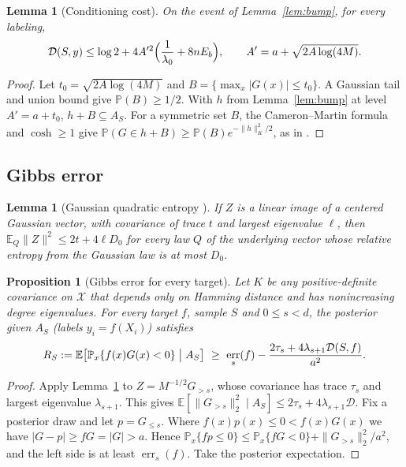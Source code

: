 \documentclass[11pt]{article}
\newtheorem{lemma}[theorem]{Lemma}
\newtheorem{proposition}[theorem]{Proposition}
\theoremstyle{definition}\newtheorem{assumption}[theorem]{Assumption}
\theoremstyle{remark}\newtheorem{remark}[theorem]{Remark}
\DeclareMathOperator{\err}{err}
\newcommand{\E}{\mathbb E}
\newcommand{\Pp}{\mathbb P}
\newcommand{\X}{\mathcal X}
\begin{document}
\begin{lemma}[Conditioning cost]\label{lem:cost}
On the event of Lemma~\ref{lem:bump}, for every labeling,
\[
 \mathcal D(S,y)\le\log2+4A'^2\Bigl(\frac1{\lambda_0}+8nE_b\Bigr),
 \qquad A'=a+\sqrt{2A\log(4M)} .
\]
\end{lemma}
\begin{proof}
Let $t_0=\sqrt{2A\log(4M)}$ and $B=\{\max_x|G(x)|\le t_0\}$. A Gaussian
tail and union bound give $\Pp(B)\ge1/2$. With $h$ from
Lemma~\ref{lem:bump} at level $A'=a+t_0$, $h+B\subseteq A_S$. For a
symmetric set $B$, the Cameron--Martin formula and $\cosh\ge1$ give
$\Pp(G\in h+B)\ge\Pp(B)e^{-\|h\|_K^2/2}$, as in
\cite[proof of Lemma~7.1]{subcritical}.
\end{proof}

\subsection{Gibbs error}
\begin{lemma}[Gaussian quadratic entropy {\cite[Lemma~9.1]{subcritical}}]
\label{lem:entropy}
If $Z$ is a linear image of a centered Gaussian vector, with covariance of
trace $t$ and largest eigenvalue $\ell$, then $\E_Q\|Z\|^2\le2t+4\ell D_0$
for every law $Q$ of the underlying vector whose relative entropy from
the Gaussian law is at most $D_0$.
\end{lemma}

\begin{proposition}[Gibbs error for every target]\label{prop:gibbs}
Let $K$ be any positive-definite covariance on $\X$ that depends only on
Hamming distance and has nonincreasing degree eigenvalues. For every
target $f$, sample $S$ and $0\le s<d$, the posterior given
$A_S$ (labels $y_i=f(X_i)$) satisfies
\[
 R_S:=\E\bigl[\Pp_x\{f(x)G(x)<0\}\bigm|A_S\bigr]
 \ \ge\ \err_s(f)-\frac{2\tau_s+4\lambda_{s+1}\mathcal D(S,f)}{a^2}.
\]
\end{proposition}
\begin{proof}
Apply Lemma~\ref{lem:entropy} to $Z=M^{-1/2}G_{>s}$, whose covariance has
trace $\tau_s$ and largest eigenvalue $\lambda_{s+1}$. This gives
$\E[\|G_{>s}\|_2^2\mid A_S]\le2\tau_s+4\lambda_{s+1}\mathcal D$. Fix a
posterior draw and let $p=G_{\le s}$. Where $f(x)p(x)\le0<f(x)G(x)$ we have
$|G-p|\ge fG=|G|>a$. Hence
$\Pp_x\{fp\le0\}\le\Pp_x\{fG<0\}+\|G_{>s}\|_2^2/a^2$, and the left side is
at least $\err_s(f)$. Take the posterior expectation.
\end{proof}
\end{document}
